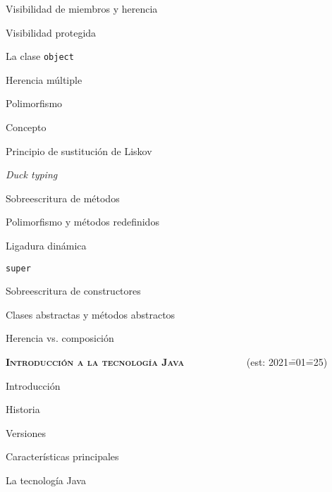\begin{longenum}
\begin{longenum}
\begin{longenum}
\begin{longenum}
                \item Visibilidad de miembros y herencia
                \begin{longenum}
                    \item Visibilidad protegida
                \end{longenum}
                \item La clase \texttt{object}
                \item Herencia múltiple
            \end{longenum}
        \end{longenum}
        \item Polimorfismo
        \begin{longenum}
            \item Concepto
            \item Principio de sustitución de Liskov
            \item \textit{Duck typing}
            \item Sobreescritura de métodos
            \begin{longenum}
                \item Polimorfismo y métodos redefinidos
            \end{longenum}
            \item Ligadura dinámica
            \item \texttt{super}
            \item Sobreescritura de constructores
            \item Clases abstractas y métodos abstractos
        \end{longenum}
        \item Herencia vs. composición
    \end{longenum}
    \item \textbf{\textsc{Introducción a la tecnología Java}} \ \ \ \ \ \ \ \ \ \ \ \ (est: 2021\==01\==25)
    \begin{longenum}
        \item Introducción
        \begin{longenum}
            \item Historia
            \item Versiones
            \item Características principales
        \end{longenum}
        \item La tecnología Java

\end{longenum}
\end{longenum}
